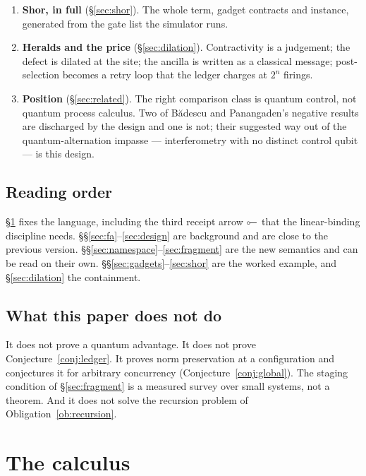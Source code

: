 \documentclass[11pt,a4paper]{article}
\theoremstyle{plain}
\theoremstyle{definition}
\theoremstyle{remark}
\newcommand{\lolli}{\mathrel{\reflectbox{$\multimap$}}}
\begin{document}
\begin{enumerate}[leftmargin=1.4em,itemsep=3pt]
\item \textbf{Shor, in full} (\S\ref{sec:shor}). The whole term, gadget
contracts and instance, generated from the gate list the simulator runs.

\item \textbf{Heralds and the price} (\S\ref{sec:dilation}). Contractivity is a
judgement; the defect is dilated at the site; the ancilla is written as a
classical message; post-selection becomes a retry loop that the ledger charges
at $2^n$ firings.

\item \textbf{Position} (\S\ref{sec:related}). The right comparison class is
quantum control, not quantum process calculus. Two of Bădescu and Panangaden's
negative results \cite{BadescuPanangaden} are discharged by the design and one
is not; their suggested way out of the quantum-alternation impasse ---
interferometry with no distinct control qubit --- is this design.
\end{enumerate}

\subsection{Reading order}

\S\ref{sec:calculus} fixes the language, including the third receipt arrow
$\lolli$ that the linear-binding discipline needs.
\S\S\ref{sec:fa}--\ref{sec:design} are background and are close to the
previous version. \S\S\ref{sec:namespace}--\ref{sec:fragment} are the new
semantics and can be read on their own.
\S\S\ref{sec:gadgets}--\ref{sec:shor} are the worked example, and
\S\ref{sec:dilation} the containment.

\subsection{What this paper does not do}

It does not prove a quantum advantage. It does not prove
Conjecture~\ref{conj:ledger}. It proves norm preservation at a configuration and
conjectures it for arbitrary concurrency (Conjecture~\ref{conj:global}). The
staging condition of \S\ref{sec:fragment} is a measured survey over small
systems, not a theorem. And it does not solve the recursion problem of
Obligation~\ref{ob:recursion}.

\section{The calculus}\label{sec:calculus}
\end{document}
